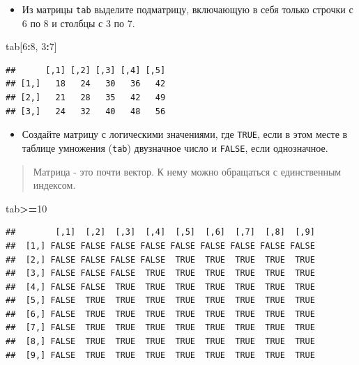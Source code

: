 \documentclass[]{book}
\newenvironment{Shaded}{\begin{snugshade}}{\end{snugshade}}
\newcommand{\DecValTok}[1]{\textcolor[rgb]{0.00,0.00,0.81}{#1}}
\newcommand{\CommentTok}[1]{\textcolor[rgb]{0.56,0.35,0.01}{\textit{#1}}}
\newcommand{\OperatorTok}[1]{\textcolor[rgb]{0.81,0.36,0.00}{\textbf{#1}}}
\newcommand{\NormalTok}[1]{#1}
\providecommand{\tightlist}{%
  \setlength{\itemsep}{0pt}\setlength{\parskip}{0pt}}
\begin{document}
\begin{Shaded}
\end{Shaded}

\begin{itemize}
\tightlist
\item
  Из матрицы \texttt{tab} выделите подматрицу, включающую в себя только
  строчки с 6 по 8 и столбцы с 3 по 7.
\end{itemize}

\begin{Shaded}
\begin{Highlighting}[]
\NormalTok{tab[}\DecValTok{6}\OperatorTok{:}\DecValTok{8}\NormalTok{, }\DecValTok{3}\OperatorTok{:}\DecValTok{7}\NormalTok{]}
\end{Highlighting}
\end{Shaded}

\begin{verbatim}
##      [,1] [,2] [,3] [,4] [,5]
## [1,]   18   24   30   36   42
## [2,]   21   28   35   42   49
## [3,]   24   32   40   48   56
\end{verbatim}

\begin{itemize}
\tightlist
\item
  Создайте матрицу с логическими значениями, где \texttt{TRUE}, если в
  этом месте в таблице умножения (\texttt{tab}) двузначное число и
  \texttt{FALSE}, если однозначное.
\end{itemize}

\begin{quote}
Матрица - это почти вектор. К нему можно обращаться с единственным
индексом.
\end{quote}

\begin{Shaded}
\begin{Highlighting}[]
\NormalTok{tab}\OperatorTok{>=}\DecValTok{10}
\end{Highlighting}
\end{Shaded}

\begin{verbatim}
##        [,1]  [,2]  [,3]  [,4]  [,5]  [,6]  [,7]  [,8]  [,9]
##  [1,] FALSE FALSE FALSE FALSE FALSE FALSE FALSE FALSE FALSE
##  [2,] FALSE FALSE FALSE FALSE  TRUE  TRUE  TRUE  TRUE  TRUE
##  [3,] FALSE FALSE FALSE  TRUE  TRUE  TRUE  TRUE  TRUE  TRUE
##  [4,] FALSE FALSE  TRUE  TRUE  TRUE  TRUE  TRUE  TRUE  TRUE
##  [5,] FALSE  TRUE  TRUE  TRUE  TRUE  TRUE  TRUE  TRUE  TRUE
##  [6,] FALSE  TRUE  TRUE  TRUE  TRUE  TRUE  TRUE  TRUE  TRUE
##  [7,] FALSE  TRUE  TRUE  TRUE  TRUE  TRUE  TRUE  TRUE  TRUE
##  [8,] FALSE  TRUE  TRUE  TRUE  TRUE  TRUE  TRUE  TRUE  TRUE
##  [9,] FALSE  TRUE  TRUE  TRUE  TRUE  TRUE  TRUE  TRUE  TRUE
\end{verbatim}
\end{document}
